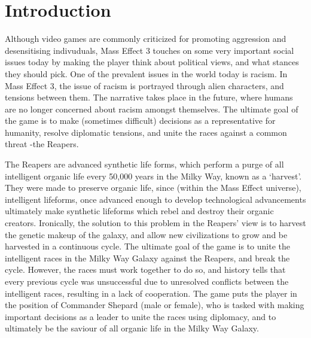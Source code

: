 \documentclass[journal]{IEEEtran}
\begin{document}
%
%
\section{Introduction}
Although video games are commonly criticized for promoting aggression and desensitising indivuduals, Mass Effect 3 touches on some very important %
social issues today by making the player think about political views,
and what stances they should pick. One of the prevalent issues in the world today is racism. In Mass Effect 3, the issue of racism is portrayed through alien characters, and tensions between them. The narrative takes place in the future, where humans are no longer concerned about racism amongst themselves. The ultimate goal of the game is to make (sometimes difficult) decisions as a representative for humanity, resolve diplomatic tensions, and unite the races against a common threat -the Reapers.

The Reapers are advanced synthetic life forms, which perform a purge of all intelligent organic life every 50,000 years in the Milky Way,
known as a `harvest'. They were made to preserve organic life, since
(within the Mass Effect universe), intelligent lifeforms, once advanced
enough to develop technological advancements ultimately make synthetic
lifeforms which rebel and destroy their organic creators. Ironically,
the solution to this problem in the Reapers' view is to harvest the genetic makeup of the galaxy, and allow new civilizations to grow and be harvested in a continuous cycle. The ultimate goal of the game is to unite the intelligent
races in the Milky Way Galaxy against the Reapers, and break the cycle.
However, the races must work together to do so,
and history tells that every previous cycle was
unsuccessful due to unresolved conflicts between the intelligent races, resulting in a lack of cooperation. The game puts the player in the position of Commander Shepard (male or female), who is tasked with making important decisions as a leader to unite the races using diplomacy, and to ultimately be the saviour of all organic life in the Milky Way Galaxy.
\end{document}
